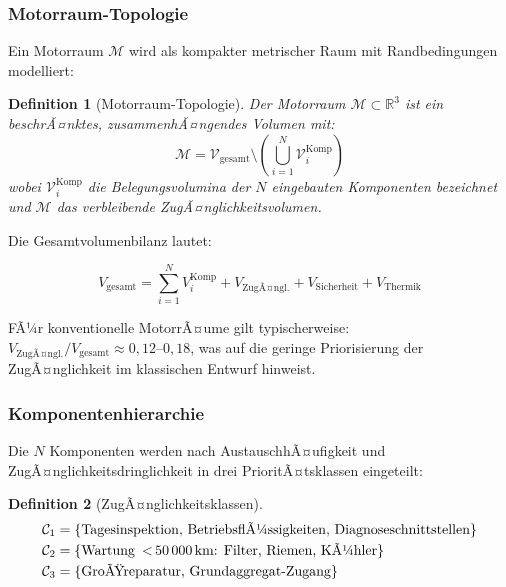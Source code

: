 ﻿\documentclass[12pt,a4paper]{article}
\newtheorem{definition}{Definition}[section]
\begin{document}
\subsubsection{Motorraum-Topologie}

Ein Motorraum $\mathcal{M}$ wird als kompakter metrischer Raum mit Randbedingungen
modelliert:

\begin{definition}[Motorraum-Topologie]
	Der Motorraum $\mathcal{M} \subset \mathbb{R}^3$ ist ein beschrÃ¤nktes,
	zusammenhÃ¤ngendes Volumen mit:
	\begin{equation}
		\mathcal{M} = \mathcal{V}_\mathrm{gesamt} \setminus
		\left(\bigcup_{i=1}^{N} \mathcal{V}_i^\mathrm{Komp}\right)
		\label{eq:motorraum_top}
	\end{equation}
	wobei $\mathcal{V}_i^\mathrm{Komp}$ die Belegungsvolumina der $N$ eingebauten
	Komponenten bezeichnet und $\mathcal{M}$ das verbleibende ZugÃ¤nglichkeitsvolumen.
\end{definition}

Die Gesamtvolumenbilanz lautet:

\begin{equation}
	V_\mathrm{gesamt} = \sum_{i=1}^{N} V_i^\mathrm{Komp} + V_\mathrm{ZugÃ¤ngl.}
	+ V_\mathrm{Sicherheit} + V_\mathrm{Thermik}
	\label{eq:volumenbilanz}
\end{equation}

FÃ¼r konventionelle MotorrÃ¤ume gilt typischerweise:
$V_\mathrm{ZugÃ¤ngl.}/V_\mathrm{gesamt} \approx 0{,}12\text{--}0{,}18$,
was auf die geringe Priorisierung der ZugÃ¤nglichkeit im klassischen Entwurf
hinweist.

\subsubsection{Komponentenhierarchie}

Die $N$ Komponenten werden nach AustauschhÃ¤ufigkeit und ZugÃ¤nglichkeitsdringlichkeit
in drei PrioritÃ¤tsklassen eingeteilt:

\begin{definition}[ZugÃ¤nglichkeitsklassen]
	\begin{align}
		\mathcal{C}_1 &= \{\text{Tagesinspektion, BetriebsflÃ¼ssigkeiten, Diagnoseschnittstellen}\}
		\label{eq:klasse1} \\
		\mathcal{C}_2 &= \{\text{Wartung \,<\,50\,000\,km: Filter, Riemen, KÃ¼hler}\}
		\label{eq:klasse2} \\
		\mathcal{C}_3 &= \{\text{GroÃŸreparatur, Grundaggregat-Zugang}\}
		\label{eq:klasse3}
	\end{align}
\end{definition}
\end{document}
